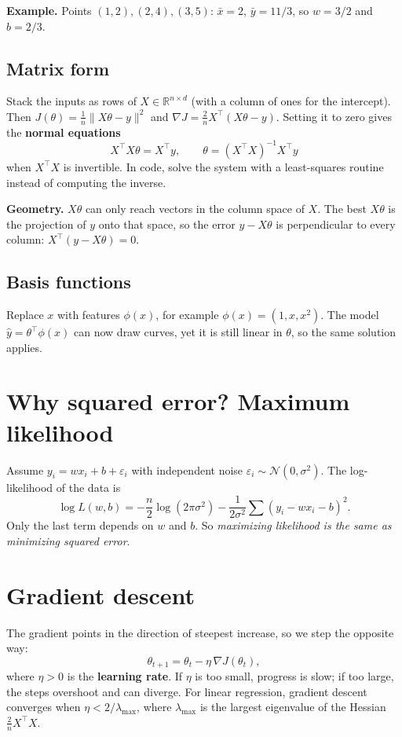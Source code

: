 \documentclass[11pt,a4paper]{article}
\begin{document}
\textbf{Example.} Points $(1,2), (2,4), (3,5)$: $\bar{x} = 2$, $\bar{y} = 11/3$, so $w = 3/2$ and $b = 2/3$.

\subsection{Matrix form}
Stack the inputs as rows of $X \in \mathbb{R}^{n \times d}$ (with a column of ones for the intercept). Then $J(\theta) = \frac1n \|X\theta - y\|^2$ and $\nabla J = \frac{2}{n} X^\top (X\theta - y)$. Setting it to zero gives the \textbf{normal equations}
\[ X^\top X \theta = X^\top y, \qquad \theta = (X^\top X)^{-1} X^\top y \]
when $X^\top X$ is invertible. In code, solve the system with a least-squares routine instead of computing the inverse.

\textbf{Geometry.} $X\theta$ can only reach vectors in the column space of $X$. The best $X\theta$ is the projection of $y$ onto that space, so the error $y - X\theta$ is perpendicular to every column: $X^\top (y - X\theta) = 0$.

\subsection{Basis functions}
Replace $x$ with features $\phi(x)$, for example $\phi(x) = (1, x, x^2)$. The model $\hat{y} = \theta^\top \phi(x)$ can now draw curves, yet it is still linear in $\theta$, so the same solution applies.

\section{Why squared error? Maximum likelihood}
Assume $y_i = w x_i + b + \varepsilon_i$ with independent noise $\varepsilon_i \sim \mathcal{N}(0, \sigma^2)$. The log-likelihood of the data is
\[ \log L(w,b) = -\frac{n}{2}\log(2\pi\sigma^2) - \frac{1}{2\sigma^2}\sum (y_i - w x_i - b)^2 . \]
Only the last term depends on $w$ and $b$. So \emph{maximizing likelihood is the same as minimizing squared error}.

\section{Gradient descent}
The gradient points in the direction of steepest increase, so we step the opposite way:
\[ \theta_{t+1} = \theta_t - \eta\, \nabla J(\theta_t), \]
where $\eta > 0$ is the \textbf{learning rate}. If $\eta$ is too small, progress is slow; if too large, the steps overshoot and can diverge. For linear regression, gradient descent converges when $\eta < 2/\lambda_{\max}$, where $\lambda_{\max}$ is the largest eigenvalue of the Hessian $\frac{2}{n}X^\top X$.
\end{document}
